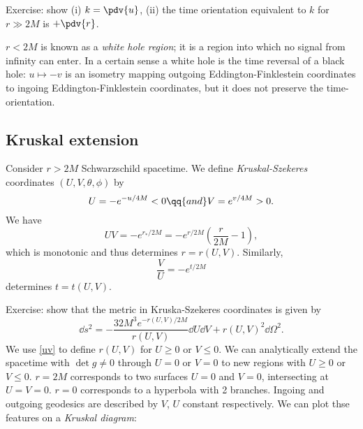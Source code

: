 \documentclass{jknotes}
\begin{document}
Exercise: show (i) \(k=\pdv{u}\), (ii) the time orientation equivalent to \(k\) for \(r\gg2M\) is \(+\pdv{r}\).

\(r<2M\) is known as a \emph{white hole region}; it is a region into which no signal from infinity can enter. In a certain sense a white hole is the time reversal of a black hole: \(u\mapsto -v\) is an isometry mapping outgoing Eddington-Finklestein coordinates to ingoing Eddington-Finklestein coordinates, but it does not preserve the time-orientation.

\subsection{Kruskal extension}
Consider \(r>2M\) Schwarzschild spacetime. We define \emph{Kruskal-Szekeres} coordinates \((U,V,\theta,\phi)\) by
\begin{equation}
    U = -e^{-u/4M} < 0
    \qq{and}
    V = e^{v/4M} > 0.
\end{equation}
We have
\begin{equation}
    UV = -e^{r_*/2M} = - e^{r/2M}\left( \frac{r}{2M} - 1 \right),
    \tag{\(**\)}
    \label{uv}
\end{equation}
which is monotonic and thus determines \(r = r(U,V)\). Similarly, 
\begin{equation}
    \frac{V}{U} = -e^{t/2M}
\end{equation}
determines \(t = t(U,V)\).

Exercise: show that the metric in Kruska-Szekeres coordinates is given by
\begin{equation}
    \dd{s}^2 = -\frac{32M^3e^{-r(U,V)/2M}}{r(U,V)} \dd{U}\dd{V} + r(U,V)^2 \dd{\Omega}^2.
\end{equation}
We use \eqref{uv} to define \(r(U,V)\) for \(U\ge0\) or \(V\le0\). We can analytically extend the spacetime with \(\det g \ne0\) through \(U=0\) or \(V=0\) to new regions with \(U\ge0\) or \(V\le0\). \(r=2M\) corresponds to two surfaces \(U=0\) and \(V=0\), intersecting at \(U=V=0\). \(r=0\) corresponds to a hyperbola with 2 branches. Ingoing and outgoing geodesics are described by \(V\), \(U\) constant respectively. We can plot thse features on a \emph{Kruskal diagram}:
\end{document}

